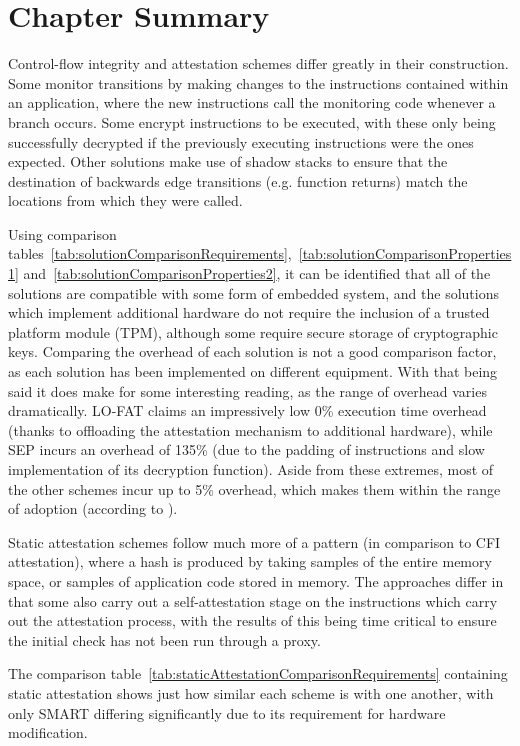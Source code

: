 \section{Chapter Summary}
Control-flow integrity and attestation schemes differ greatly in their construction. Some monitor transitions by making changes to the instructions contained within an application, where the new instructions call the monitoring code whenever a branch occurs. Some encrypt instructions to be executed, with these only being successfully decrypted if the previously executing instructions were the ones expected. Other solutions make use of shadow stacks to ensure that the destination of backwards edge transitions (e.g. function returns) match the locations from which they were called.

Using comparison tables~\ref{tab:solutionComparisonRequirements},~\ref{tab:solutionComparisonProperties1} and~\ref{tab:solutionComparisonProperties2}, it can be identified that all of the solutions are compatible with some form of embedded system, and the solutions which implement additional hardware do not require the inclusion of a trusted platform module (TPM), although some require secure storage of cryptographic keys. Comparing the overhead of each solution is not a good comparison factor, as each solution has been implemented on different equipment. With that being said it does make for some interesting reading, as the range of overhead varies dramatically. LO-FAT \cite{Dessouky2017} claims an impressively low 0\% execution time overhead (thanks to offloading the attestation mechanism to additional hardware), while SEP \cite{Lee2019} incurs an overhead of 135\% (due to the padding of instructions and slow implementation of its decryption function). Aside from these extremes, most of the other schemes incur up to 5\% overhead, which makes them within the range of adoption (according to \cite{Szekeres2013}).

Static attestation schemes follow much more of a pattern (in comparison to CFI attestation), where a hash is produced by taking samples of the entire memory space, or samples of application code stored in memory. The approaches differ in that some also carry out a self-attestation stage on the instructions which carry out the attestation process, with the results of this being time critical to ensure the initial check has not been run through a proxy.

The comparison table~\ref{tab:staticAttestationComparisonRequirements} containing static attestation shows just how similar each scheme is with one another, with only SMART \cite{For} differing significantly due to its requirement for hardware modification.